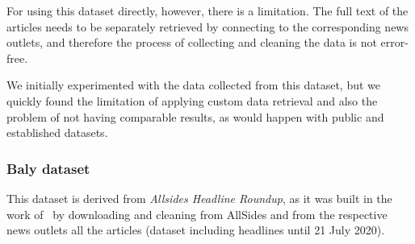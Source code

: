 




For using this dataset directly, however, there is a limitation. The full text of the articles needs to be separately retrieved by connecting to the corresponding news outlets, and therefore the process of collecting and cleaning the data is not error-free.

We initially experimented with the data collected from this dataset, but we quickly found the limitation of applying custom data retrieval and also the problem of not having comparable results, as would happen with public and established datasets.


\subsubsection{Baly dataset}

This dataset is derived from \emph{Allsides Headline Roundup\texttrademark}, as it was built in the work of~\citet{baly2020we} by downloading and cleaning from AllSides and from the respective news outlets all the articles (dataset including headlines until 21 July 2020).

